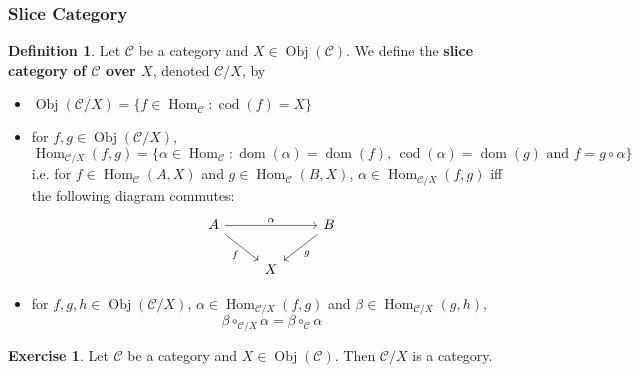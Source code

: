 \documentclass[12pt]{amsart}
\theoremstyle{definition}
\newtheorem{defn}[definition]{Definition}
\newtheorem{ex}[definition]{Exercise}
\newcommand{\al}{\alpha}
\newcommand{\be}{\beta}
\newcommand{\MC}{\mathcal{C}}
\DeclareMathOperator{\dom}{dom}
\DeclareMathOperator{\cod}{cod}
\DeclareMathOperator{\Obj}{Obj}
\DeclareMathOperator{\Hom}{Hom}
\DeclareMathOperator*{\0}{\mbf{0}}
\DeclareMathOperator*{\1}{\mbf{1}}
\newcommand{\lex}[1]{\label{ex:#1}}
\newcommand{\ld}[1]{\label{defn:#1}}
\begin{document}
	
	
	
	\subsubsection{Slice Category}
	
	\begin{defn} \ld{12006}
		Let $\MC$ be a category and $X \in \Obj(\MC)$. We define the \textbf{slice category of $\MC$ over $X$}, denoted $\MC / X$, by
		\begin{itemize}
			\item $\Obj(\MC / X) = \{f \in \Hom_{\MC}: \cod(f) = X\}$
			\item for $f,g \in \Obj(\MC / X)$, 
			$$\Hom_{\MC / X}(f, g) = \{\al \in \Hom_{\MC} : \dom(\al) = \dom(f) \text{, } \cod(\al) = \dom(g) \text{ and } f = g \circ \al \}$$
			i.e. for $f \in \Hom_{\MC}(A, X)$ and $g \in \Hom_{\MC}(B, X)$, $\al \in \Hom_{\MC / X}(f, g)$ iff the following diagram commutes: 
			\[ 
			\begin{tikzcd}
				A \arrow[rr, "\al"] \arrow[dr, "f"'] 	
				& & B  \arrow[dl, "g"] \\
				& X 
			\end{tikzcd}
			\]
			\item for $f,g, h \in \Obj(\MC / X)$, $\al \in \Hom_{\MC / X}(f, g)$ and $\be \in \Hom_{\MC / X}(g, h)$, 
			$$\be \circ_{\MC / X} \al = \be \circ_{\MC} \al$$
		\end{itemize}
	\end{defn}
	
	\begin{ex}  \lex{12007}
		Let $\MC$ be a category and $X \in \Obj(\MC)$. Then $\MC / X$ is a category.
	\end{ex}
\end{document}
